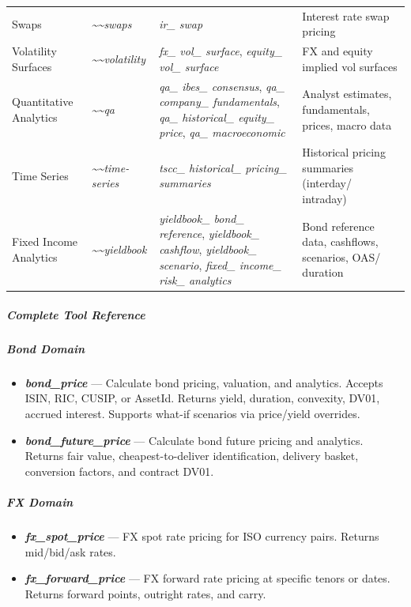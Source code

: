\documentclass[11pt]{article}
\begin{document}
\begin{longtable}
{} Swaps & \emph{\textasciitilde{}\textasciitilde{}swaps} & \emph{ir\_\allowbreak{} swap} & Interest rate swap pricing \\
{} Volatility Surfaces & \emph{\textasciitilde{}\textasciitilde{}volatility} & \emph{fx\_\allowbreak{} vol\_\allowbreak{} surface}, \emph{equity\_\allowbreak{} vol\_\allowbreak{} surface} & FX and equity implied vol surfaces \\
{} Quantitative Analytics & \emph{\textasciitilde{}\textasciitilde{}qa} & \emph{qa\_\allowbreak{} ibes\_\allowbreak{} consensus}, \emph{qa\_\allowbreak{} company\_\allowbreak{} fundamentals}, \emph{qa\_\allowbreak{} historical\_\allowbreak{} equity\_\allowbreak{} price}, \emph{qa\_\allowbreak{} macroeconomic} & Analyst estimates, fundamentals, prices, macro data \\
{} Time Series & \emph{\textasciitilde{}\textasciitilde{}time-series} & \emph{tscc\_\allowbreak{} historical\_\allowbreak{} pricing\_\allowbreak{} summaries} & Historical pricing summaries (interday/ intraday) \\
{} Fixed Income Analytics & \emph{\textasciitilde{}\textasciitilde{}yieldbook} & \emph{yieldbook\_\allowbreak{} bond\_\allowbreak{} reference}, \emph{yieldbook\_\allowbreak{} cashflow}, \emph{yieldbook\_\allowbreak{} scenario}, \emph{fixed\_\allowbreak{} income\_\allowbreak{} risk\_\allowbreak{} analytics} & Bond reference data, cashflows, scenarios, OAS/ duration \\
\bottomrule
\end{longtable}
\endgroup

\subparagraph{Complete Tool Reference}\mbox{}\par

\subparagraph{Bond Domain}\mbox{}\par
\begin{itemize}[leftmargin=*,itemsep=2pt,topsep=2pt]
\item {} \textbf{\emph{bond\_\allowbreak{}price}} — Calculate bond pricing, valuation, and analytics. Accepts ISIN, RIC, CUSIP, or AssetId. Returns yield, duration, convexity, DV01, accrued interest. Supports what-if scenarios via price/yield overrides.
\item {} \textbf{\emph{bond\_\allowbreak{}future\_\allowbreak{}price}} — Calculate bond future pricing and analytics. Returns fair value, cheapest-to-deliver identification, delivery basket, conversion factors, and contract DV01.
\end{itemize}

\subparagraph{FX Domain}\mbox{}\par
\begin{itemize}[leftmargin=*,itemsep=2pt,topsep=2pt]
\item {} \textbf{\emph{fx\_\allowbreak{}spot\_\allowbreak{}price}} — FX spot rate pricing for ISO currency pairs. Returns mid/bid/ask rates.
\item {} \textbf{\emph{fx\_\allowbreak{}forward\_\allowbreak{}price}} — FX forward rate pricing at specific tenors or dates. Returns forward points, outright rates, and carry.
\end{itemize}
\end{document}
